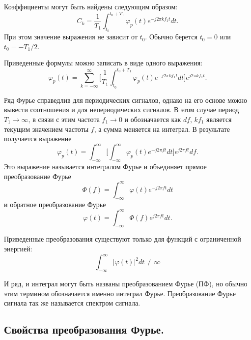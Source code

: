 \documentclass[a4paper,14pt]{extarticle}
\begin{document}
Коэффициенты могут быть найдены следующим образом:
\begin{equation*}
C_k = \frac{1}{T_1} \int_{t_0}^{t_0 + T_1} \varphi_p (t) e^{-j 2 \pi k f_1 t} dt.
\label{f2}
\end{equation*}
При этом значение выражения не зависит от $t_0$. Обычно берется $t_0 = 0$ или $t_0 = - T_1 / 2$.

Приведенные формулы можно записать в виде одного выражения:  
\begin{equation*}
\varphi_p (t) = \sum_{k = -\infty}^{\infty} \bigg[ \frac{1}{T_1} \int_{t_0}^{t_0 + T_1} \varphi_p (t) e^{-j 2 \pi k f_1 t} dt \bigg] e^{j 2 \pi k f_1 t}.
\label{f3}
\end{equation*}


Ряд Фурье справедлив для периодических сигналов, однако на его основе можно вывести соотношения и для непериодических сигналов. В этом случае период $T_1 \rightarrow \infty$, в связи с этим частота $f_1 \rightarrow 0$ и обозначается как $df$, $k f_1$ является текущим значением частоты $f$, а сумма меняется на интеграл. В результате получается выражение 
\begin{equation*}
\varphi_p (t) = \int_{-\infty}^{\infty} \bigg[ \int_{-\infty}^{\infty} \varphi_p (t) e^{-j 2 \pi f t} dt \bigg] e^{j 2 \pi f t} df.
\label{f4}
\end{equation*}
Это выражение называется интегралом Фурье и объединяет прямое преобразование Фурье
\begin{equation*}
\Phi (f) = \int_{-\infty}^{\infty} \varphi (t) e^{-j 2 \pi f t} dt
\end{equation*}
и обратное преобразование Фурье
\begin{equation*}
\varphi (t) = \int_{-\infty}^{\infty} \Phi (f) e^{j 2 \pi f t} dt.
\end{equation*}

Приведенные преобразования существуют только для функций с ограниченной энергией:
\begin{equation*}
\int_{-\infty}^{\infty} |\varphi (t)|^2 dt \neq \infty
\end{equation*}

И ряд, и интеграл могут быть названы преобразованием Фурье (ПФ), но обычно этим термином обозначается именно интеграл Фурье. Преобразование Фурье сигнала так же называется спектром сигнала.

\subsection{Свойства преобразования Фурье.}
\end{document}
